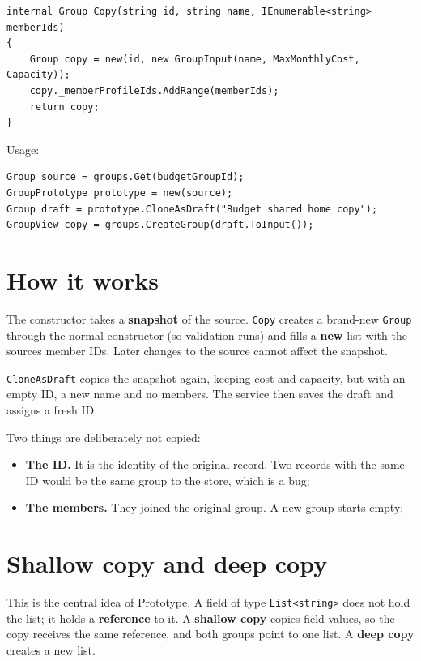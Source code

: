 \documentclass{utmreport}
\providecommand{\tightlist}{\setlength{\itemsep}{0pt}\setlength{\parskip}{0pt}}
\providecommand{\passthrough}[1]{#1}
\begin{document}
\begin{lstlisting}
internal Group Copy(string id, string name, IEnumerable<string> memberIds)
{
    Group copy = new(id, new GroupInput(name, MaxMonthlyCost, Capacity));
    copy._memberProfileIds.AddRange(memberIds);
    return copy;
}
\end{lstlisting}

Usage:

\begin{lstlisting}
Group source = groups.Get(budgetGroupId);
GroupPrototype prototype = new(source);
Group draft = prototype.CloneAsDraft("Budget shared home copy");
GroupView copy = groups.CreateGroup(draft.ToInput());
\end{lstlisting}

\section{How it works}

The constructor takes a \textbf{snapshot} of the source. \passthrough{\lstinline!Copy!} creates a brand-new \passthrough{\lstinline!Group!} through the normal constructor (so validation runs) and fills a \textbf{new} list with the source\textquotesingle s member IDs. Later changes to the source cannot affect the snapshot.

\passthrough{\lstinline!CloneAsDraft!} copies the snapshot again, keeping cost and capacity, but with an empty ID, a new name and no members. The service then saves the draft and assigns a fresh ID.

Two things are deliberately not copied:

\begin{itemize}
\tightlist
\item \textbf{The ID.} It is the identity of the original record. Two records with the same ID would be the same group to the store, which is a bug;
\item \textbf{The members.} They joined the original group. A new group starts empty;
\end{itemize}

\section{Shallow copy and deep copy}

This is the central idea of Prototype. A field of type \passthrough{\lstinline!List<string>!} does not hold the list; it holds a \textbf{reference} to it. A \textbf{shallow copy} copies field values, so the copy receives the same reference, and both groups point to one list. A \textbf{deep copy} creates a new list.
\end{document}
